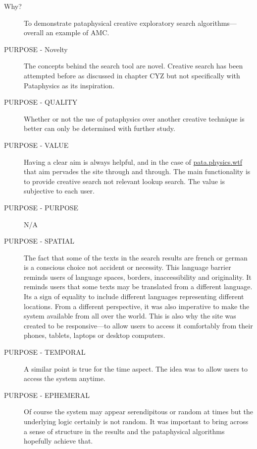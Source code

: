 \begin{description}
  \item[Why?] To demonstrate pataphysical creative exploratory search algorithms---overall an example of \ac{AMC}.
  \item[PURPOSE - Novelty] The concepts behind the search tool are novel. Creative search has been attempted before as discussed in chapter CYZ but not specifically with Pataphysics as its inspiration.
  \item[PURPOSE - QUALITY] Whether or not the use of pataphysics over another creative technique is better can only be determined with further study.
  \item[PURPOSE - VALUE] Having a clear aim is always helpful, and in the case of \url{pata.physics.wtf} that aim pervades the site through and through. The main functionality is to provide creative search not relevant lookup search. The value is subjective to each user.
  \item[PURPOSE - PURPOSE] N/A
  \item[PURPOSE - SPATIAL] The fact that some of the texts in the search results are french or german is a conscious choice not accident or necessity. This language barrier reminds users of language spaces, borders, inaccessibility and originality. It reminds users that some texts may be translated from a different language. Its a sign of equality to include different languages representing different locations. From a different perspective, it was also imperative to make the system available from all over the world. This is also why the site was created to be responsive---to allow users to access it comfortably from their phones, tablets, laptops or desktop computers.
  \item[PURPOSE - TEMPORAL] A similar point is true for the time aspect. The idea was to allow users to access the system anytime.
  \item[PURPOSE - EPHEMERAL] Of course the system may appear serendipitous or random at times but the underlying logic certainly is not random. It was important to bring across a sense of structure in the results and the pataphysical algorithms hopefully achieve that.
\end{description}

\spirals

